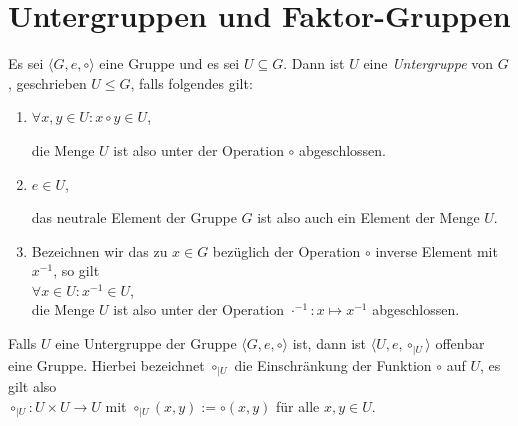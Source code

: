 \section{Untergruppen und Faktor-Gruppen}
\begin{Definition}[Untergruppe]
  Es sei $\langle G, e, \circ \rangle$ eine Gruppe und es sei $U \subseteq G$.  Dann ist $U$ eine 
  \emph{\color{blue}Untergruppe} von $G$, geschrieben $U \leq G$, falls folgendes gilt:
  \begin{enumerate}
  \item $\forall x, y \in U: x \circ y \in U$,

        die Menge $U$ ist also unter der Operation $\circ$ abgeschlossen.
  \item $e \in U$,

        das neutrale Element der Gruppe $G$ ist also auch ein Element der Menge $U$.
  \item Bezeichnen wir das zu $x \in G$ bez\"{u}glich der Operation $\circ$ inverse Element mit $x^{-1}$, 
        so gilt
        \\[0.2cm]
        \hspace*{1.3cm}
        $\forall x \in U: x^{-1} \in U$,
        \\[0.2cm]
        die Menge $U$ ist also unter der Operation $\cdot^{-1}: x \mapsto x^{-1}$ abgeschlossen.
        \eoxs
  \end{enumerate}
\end{Definition}

\remark
Falls $U$ eine Untergruppe der Gruppe $\langle G, e, \circ \rangle$ ist, dann ist 
$\langle U, e, \circ_{|U} \rangle$
offenbar eine Gruppe.  Hierbei bezeichnet $\circ_{|U}$ die Einschr\"{a}nkung der Funktion $\circ$ auf $U$, es
gilt also
\\[0.2cm]
\hspace*{1.3cm}
$\circ_{|U}: U \times U \rightarrow U$ \quad mit $\circ_{|U}(x,y) := \circ(x,y)$ f\"{u}r alle $x,y \in U$.
\eoxs

